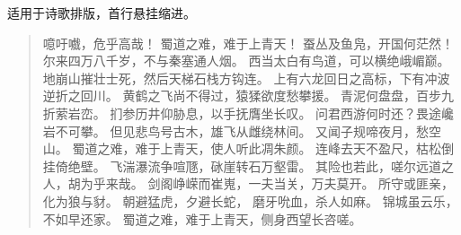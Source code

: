 \documentclass[utf8]{book}
\newcommand{\latexcommand}[1]{\fbox{\textbf{\textbackslash #1}}}
\begin{document}
		\latexcommand{verse}适用于诗歌排版，首行悬挂缩进。
		\begin{verse}
			噫吁嚱，危乎高哉！
			蜀道之难，难于上青天！
			蚕丛及鱼凫，开国何茫然！
			尔来四万八千岁，不与秦塞通人烟。
			西当太白有鸟道，可以横绝峨嵋巅。
			地崩山摧壮士死，然后天梯石栈方钩连。
			上有六龙回日之高标，下有冲波逆折之回川。
			黄鹤之飞尚不得过，猿猱欲度愁攀援。
			青泥何盘盘，百步九折萦岩峦。
			扪参历井仰胁息，以手抚膺坐长叹。
			问君西游何时还？畏途巉岩不可攀。
			但见悲鸟号古木，雄飞从雌绕林间。
			又闻子规啼夜月，愁空山。
			蜀道之难，难于上青天，使人听此凋朱颜。
			连峰去天不盈尺，枯松倒挂倚绝壁。
			飞湍瀑流争喧豗，砯崖转石万壑雷。
			其险也若此，嗟尔远道之人，胡为乎来哉。
			剑阁峥嵘而崔嵬，一夫当关，万夫莫开。
			所守或匪亲，化为狼与豺。
			朝避猛虎，夕避长蛇，
			磨牙吮血，杀人如麻。
			锦城虽云乐，不如早还家。
			蜀道之难，难于上青天，侧身西望长咨嗟。
		\end{verse}
		
\end{document}
